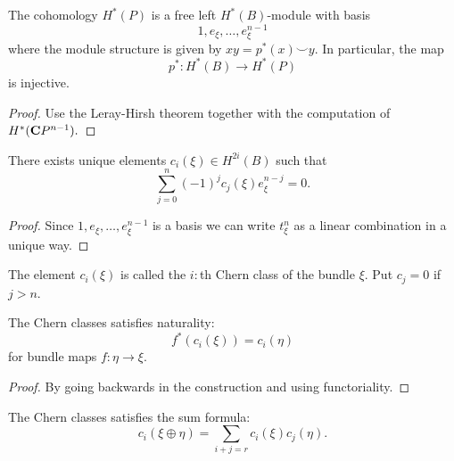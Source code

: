 \documentclass[a4paper,openany]{scrbook}
\begin{document}
\begin{lemma} \label{lemma:projectivebundlecohomology}
The cohomology $H^*(P)$ is a free left $H^*(B)$-module with basis $$1,e_\xi,\dots,e_\xi^{n-1}$$ where the module structure is given by $xy=p^*(x)\smile y.$ In particular, the map $$p^*:H^*(B)\rightarrow H^*(P)$$ is injective.
\end{lemma}

\begin{proof}
Use the Leray-Hirsh theorem together with the computation of $H^*(\mathbf C P^{n-1}).$
\end{proof}

\begin{lemma}
There exists unique elements $c_i(\xi)\in H^{2i}(B)$ such that $$\sum_{j=0}^n(-1)^jc_j(\xi)e_\xi^{n-j}=0.$$
\end{lemma}

\begin{proof}
Since $1,e_\xi,\dots,e_\xi^{n-1}$ is a basis we can write $t_\xi^n$ as a linear combination in a unique way.
\end{proof}

\begin{defn}
The element $c_i(\xi)$ is called the $i:$th Chern class of the bundle $\xi.$ Put $c_j=0$ if $j>n.$
\end{defn}

\begin{lemma}\label{lemma:chernnatural}
The Chern classes satisfies naturality: $$f^*(c_i(\xi))=c_i(\eta)$$ for bundle maps $f:\eta \rightarrow \xi.$
\end{lemma}

\begin{proof}
By going backwards in the construction and using functoriality.
\end{proof}

\begin{lemma} \label{lemma:chernsumformula}
The Chern classes satisfies the sum formula:
$$c_i(\xi\oplus\eta)=\sum_{i+j=r}c_i(\xi)c_j(\eta).$$
\end{lemma}
\end{document}
